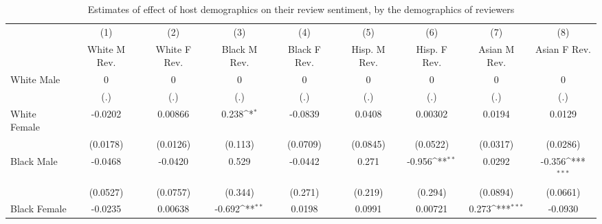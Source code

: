 \begin{sidewaystable}

{
\def\sym#1{\ifmmode^{#1}\else\(^{#1}\)\fi}
\begin{longtable}{l*{8}{c}}
\caption{Estimates of effect of host demographics on their review sentiment, by the demographics of reviewers}\\
\hline\hline\endfirsthead\hline\endhead\hline\endfoot\endlastfoot
                    &\multicolumn{1}{c}{(1)}&\multicolumn{1}{c}{(2)}&\multicolumn{1}{c}{(3)}&\multicolumn{1}{c}{(4)}&\multicolumn{1}{c}{(5)}&\multicolumn{1}{c}{(6)}&\multicolumn{1}{c}{(7)}&\multicolumn{1}{c}{(8)}\\
                    &\multicolumn{1}{c}{White M Rev.}&\multicolumn{1}{c}{White F Rev.}&\multicolumn{1}{c}{Black M Rev.}&\multicolumn{1}{c}{Black F Rev.}&\multicolumn{1}{c}{Hisp. M Rev.}&\multicolumn{1}{c}{Hisp. F Rev.}&\multicolumn{1}{c}{Asian M Rev.}&\multicolumn{1}{c}{Asian F Rev.}\\
\hline
White Male          &           0         &           0         &           0         &           0         &           0         &           0         &           0         &           0         \\
                    &         (.)         &         (.)         &         (.)         &         (.)         &         (.)         &         (.)         &         (.)         &         (.)         \\
[1em]
White Female        &     -0.0202         &     0.00866         &       0.238\sym{*}  &     -0.0839         &      0.0408         &     0.00302         &      0.0194         &      0.0129         \\
                    &    (0.0178)         &    (0.0126)         &     (0.113)         &    (0.0709)         &    (0.0845)         &    (0.0522)         &    (0.0317)         &    (0.0286)         \\
[1em]
Black Male          &     -0.0468         &     -0.0420         &       0.529         &     -0.0442         &       0.271         &      -0.956\sym{**} &      0.0292         &      -0.356\sym{***}\\
                    &    (0.0527)         &    (0.0757)         &     (0.344)         &     (0.271)         &     (0.219)         &     (0.294)         &    (0.0894)         &    (0.0661)         \\
[1em]
Black Female        &     -0.0235         &     0.00638         &      -0.692\sym{**} &      0.0198         &      0.0991         &     0.00721         &       0.273\sym{***}&     -0.0930         \\

\end{longtable}}
\end{sidewaystable}
